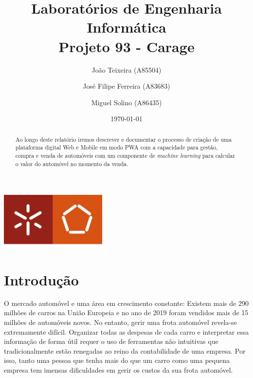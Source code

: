 \documentclass[a4paper]{report}
\begin{document}
\title{Laboratórios de Engenharia Informática\\Projeto 93 - Carage}
\author{João Teixeira (A85504) \and José Filipe Ferreira (A83683) \and Miguel Solino (A86435)}
\date{\today}

\begin{center}
    \begin{minipage}{0.75\linewidth}
        \centering
        \includegraphics[width=0.4\textwidth]{images/eng.jpeg}\par\vspace{1cm}
        \vspace{1.5cm}
        \href{https://www.uminho.pt/PT}
        {\color{black}{\scshape\LARGE Universidade do Minho}} \par
        \vspace{1cm}
        \href{https://www.di.uminho.pt/}
        {\color{black}{\scshape\Large Departamento de Informática}} \par
        \vspace{1.5cm}
        \maketitle
    \end{minipage}
\end{center}

\begin{abstract}
    \begin{center}
        Ao longo deste relatório iremos descrever e documentar o processo
        de criação de uma plataforma digital Web e Mobile em modo PWA com a
        capacidade para gestão, compra e venda de automóveis com um componente
        de \textit{machine learning} para calcular o valor do automóvel no
        momento da venda.
    \end{center}
\end{abstract}

\tableofcontents

\chapter{Introdução}

O mercado automóvel e uma área em crescimento constante: Existem
mais de 290 milhões de carros na União Europeia e no ano de 2019 foram
vendidos mais de 15 milhões de automóveis novos. No entanto, gerir uma
frota automóvel revela-se extremamente difícil. Organizar todas as
despesas de cada carro e interpretar essa informação de forma útil requer o
uso de ferramentas não intuitivas que tradicionalmente estão renegadas ao
reino da contabilidade de uma empresa. Por isso, tanto uma pessoa que tenha
mais do que um carro como uma pequena empresa tem imensas dificuldades em
gerir os custos da sua frota automóvel.
\end{document}

